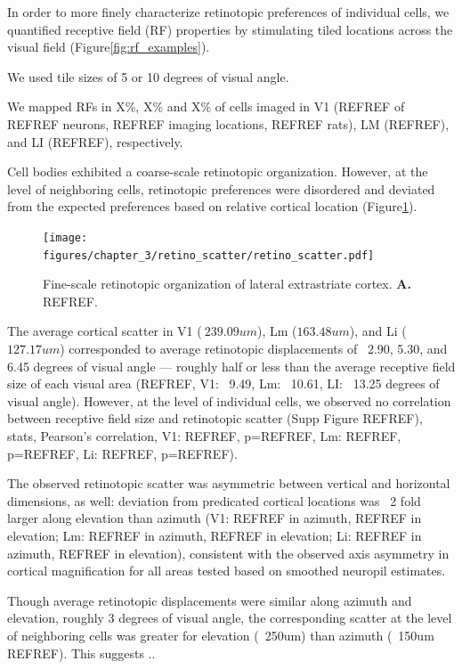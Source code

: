 In order to more finely characterize retinotopic preferences of individual cells, we quantified receptive field (RF) properties by stimulating tiled locations across the visual field (Figure\ref{fig:rf_examples}).

We used tile sizes of 5 or 10 degrees of visual angle. 

 We mapped RFs in X\%, X\% and X\% of cells imaged in V1 (REFREF of REFREF neurons, REFREF imaging locations, REFREF rats), LM (REFREF), and LI (REFREF), respectively. 
 
Cell bodies exhibited a coarse-scale retinotopic organization. However, at the level of neighboring cells, retinotopic preferences were disordered and deviated from the expected preferences based on relative cortical location (Figure\ref{fig:retino_scatter}).

\begin{figure}[t!]
    \texttt{[image: figures/chapter\_3/retino\_scatter/retino\_scatter.pdf]}
    \vspace{.1in}
    \caption[Fine-scale retinotopic organization]{Fine-scale retinotopic organization of lateral extrastriate cortex. \textbf{A.} REFREF.
    \label{fig:retino_scatter}}
\end{figure}

The average cortical scatter in V1 ($~239.09um$), Lm ($163.48 um$), and Li ($127.17 um$) corresponded to average retinotopic displacements of  ~2.90, 5.30, and 6.45 degrees of visual angle --- roughly half or less than the average receptive field size of each visual area (REFREF, V1: ~9.49, Lm: ~10.61, LI: ~13.25 degrees of visual angle). However, at the level of individual cells, we observed no correlation between receptive field size and retinotopic scatter (Supp Figure REFREF), stats, Pearson’s correlation, V1: REFREF, p=REFREF, Lm: REFREF, p=REFREF, Li: REFREF, p=REFREF).

The observed retinotopic scatter was asymmetric between vertical and horizontal dimensions, as well:  deviation from predicated cortical locations was ~2 fold larger along elevation than azimuth (V1: REFREF in azimuth, REFREF in elevation; Lm: REFREF in azimuth, REFREF in elevation; Li: REFREF in azimuth, REFREF in elevation), consistent with the observed axis asymmetry in cortical magnification for all areas tested based on smoothed neuropil estimates. 

Though average retinotopic displacements were similar along azimuth and elevation, roughly 3 degrees of visual angle, the corresponding scatter at the level of neighboring cells was greater for elevation (~250um) than azimuth (~150um REFREF). This suggests ..

